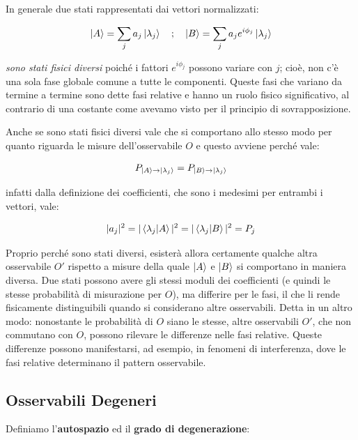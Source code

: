 	In generale due stati rappresentati dai vettori normalizzati:
	
\begin{align*}
	\ket{A} = \sum_j a_j \ket{\lambda_j} \quad ; \quad \ket{B} = \sum_{j} a_j e^{ i \phi_j}\ket{\lambda_j}
\end{align*}
	
	\textit{sono stati fisici diversi} poiché i fattori $e^{i\phi_j}$ possono variare con $j$; cioè, non c'è una sola fase globale comune a tutte le componenti. Queste fasi che variano da termine a termine sono dette fasi relative e hanno un ruolo fisico significativo, al contrario di una costante come avevamo visto per il principio di sovrapposizione.
	
	Anche se sono stati fisici diversi vale che si comportano allo stesso modo per quanto riguarda le misure dell'osservabile $O$ e questo avviene perché vale:
	
\begin{align*}
	P_{\ket{A} \to \ket{\lambda_j}} = P_{\ket{B} \to \ket{\lambda_j}}
\end{align*}

	infatti dalla definizione dei coefficienti, che sono i medesimi per entrambi i vettori, vale:
	
\begin{align*}
	|a_j|^2 = |\braket{\lambda_j}{A}|^2  = |\braket{\lambda_j}{B}|^2 = P_j
\end{align*}

	Proprio perché sono stati diversi, esisterà allora certamente qualche altra osservabile $O'$ rispetto a misure della quale $\ket{A}$ e $\ket{B}$ si comportano in maniera diversa.  Due stati possono avere gli stessi moduli dei coefficienti (e quindi le stesse probabilità di misurazione per $O$), ma differire per le fasi, il che li rende fisicamente distinguibili quando si considerano altre osservabili. Detta in un altro modo: nonostante le probabilità di $O$ siano le stesse, altre osservabili $O'$, che non commutano con $O$, possono rilevare le differenze nelle fasi relative. Queste differenze possono manifestarsi, ad esempio, in fenomeni di interferenza, dove le fasi relative determinano il pattern osservabile.

\subsection{Osservabili Degeneri}

	Definiamo l'\textbf{autospazio} ed il \textbf{grado di degenerazione}:

